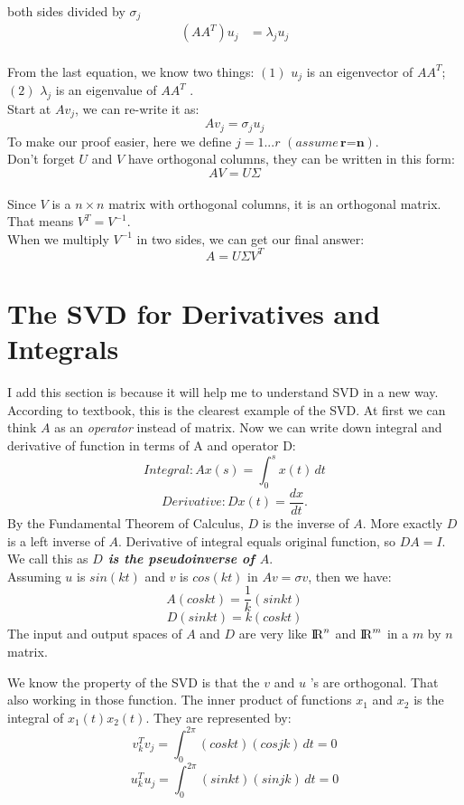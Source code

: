 \documentclass{article}
\begin{document}
\\
both sides divided by $\sigma_j$
\begin{align*}
	(AA^T)u_j  &= \lambda_j  u_j
\end{align*}
\\
From the last equation, we know two things: $(1)$ $u_j$ is an eigenvector of $AA^T$; $(2)$ $\lambda_j$ is an eigenvalue of $AA^T$ .
\\
Start at $Av_j$, we can re-write it as:
\begin{equation}
	Av_j = \sigma_j u _j
\end{equation}
To make our proof easier, here we define $j = 1 ... r$ $(assume \, \textbf{r=n})$.
\\
Don't forget $U$ and $V$ have orthogonal columns, they can be written in this form:
\begin{equation}
	AV = U \Sigma
\end{equation}
\\
Since $V$ is a $n \times n$ matrix with orthogonal columns, it is an orthogonal  matrix. That means $V^T = V^{-1}$.
\\
When we multiply $V^{-1}$ in two sides, we can get our final answer:
\begin{equation}
	A = U \Sigma V^T 
\end{equation} 

\newpage
\section{The SVD for Derivatives and Integrals}
I add this section is because it will help me to understand SVD in a new way. According to textbook,  this is the clearest example of the SVD. At first we can think $A$ as an \textit{operator} instead of matrix. Now we can write down integral and derivative of function in terms of A and operator D:
\[ Integral: Ax(s) = \int_{0}^{s} x(t) \,dt\] 
\[Derivative: Dx(t) = \frac{dx}{dt}.\]
By the Fundamental Theorem of Calculus, $D$ is the inverse of $A$. More exactly $D$ is a left inverse of $A$. Derivative of integral equals original function, so $DA = I$. We call this as \textbf{\textit{$D$ is the pseudoinverse of $A$}}.
\\
Assuming $u$ is $sin(kt)$ and $v$ is $cos(kt)$ in $Av = \sigma v$, then we have:
\[A(coskt) = \frac{1}{k}(sinkt)\]
\[D(sinkt) = k(coskt)\]
The input and output spaces of $A$ and $D$ are very like ${\rm I\!R}^{n}$ and ${\rm I\!R}^{m}$ in a $m$ by $n$ matrix.

We know the property of the SVD is that the $v$ and $u$ 's are orthogonal. That also working in those function. The inner product of functions $x_1$ and $x_2$ is the integral of $x_1(t)x_2(t)$. They are represented by:
\[v_k^{T}v_j =  \int_{0}^{2 \pi} (coskt)(cosjk) \,dt = 0\]
\[u_k^{T}u_j =  \int_{0}^{2 \pi} (sinkt)(sinjk) \,dt = 0\]
\end{document}
